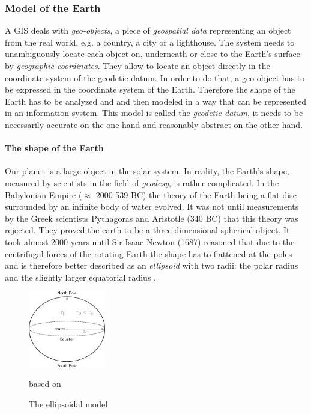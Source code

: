 

\subsubsection{Model of the Earth} %
\label{ssub:model_of_the_earth}

A GIS deals with \emph{geo-objects}, a piece of \emph{geospatial data} representing an object from the real world, e.g. a country, a city or a lighthouse. The system needs to unambiguously locate each object on, underneath or close to the Earth's surface by \emph{geographic coordinates}. They allow to locate an object directly in the coordinate system of the geodetic datum. In order to do that, a geo-object has to be expressed in the coordinate system of the Earth. Therefore the shape of the Earth has to be analyzed and and then modeled in a way that can be represented in an information system. This model is called the \emph{geodetic datum}, it needs to be necessarily accurate on the one hand and reasonably abstract on the other hand.


\paragraph{The shape of the Earth} %
\label{par:the_shape_of_the_earth}

Our planet is a large object in the solar system. In reality, the Earth's shape, measured by scientists in the field of \emph{geodesy}, is rather complicated. In the Babylonian Empire ($\approx$ 2000-539 BC) the theory of the Earth being a flat disc surrounded by an infinite body of water
evolved. It was not until measurements by the Greek scientists Pythagoras and Aristotle (340 BC) that this theory was rejected. They proved the earth to be a three-dimensional spherical object. It took almost 2000 years until Sir Isaac Newton (1687) reasoned that due to the centrifugal forces of the rotating Earth the shape has to flattened at the poles and is therefore better described as an \emph{ellipsoid} with two radii: the polar radius and the slightly larger equatorial radius
\cite[pp. 69-77]{bolstad2008gis}.

\begin{figure}[ht]
  \centering
  \includegraphics[width = 0.3\textwidth]{graphics/basics/ellipsoid}
  \caption{The ellipsoidal model}
  \small{based on \cite[Fig. 3-3, p. 72]{bolstad2008gis}}
  \label{fig:ellipsoid}
\end{figure}

